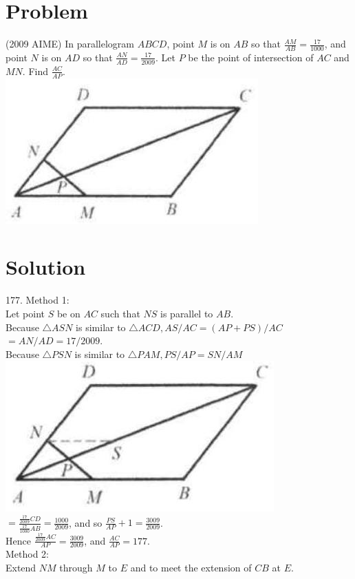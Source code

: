 \documentclass{article}
\begin{document}
\section*{Problem}
(2009 AIME) In parallelogram \(A B C D\), point \(M\) is on \(A B\) so that \(\frac{A M}{A B}=\frac{17}{1000}\), and point \(N\) is on \(A D\) so that \(\frac{A N}{A D}=\frac{17}{2009}\). Let \(P\) be the point of intersection of \(A C\) and \(M N\). Find \(\frac{A C}{A P}\).\\
\centering
\includegraphics[width=\textwidth]{images/130(2).jpg}

\section*{Solution}
177.
Method 1:\\
Let point \(S\) be on \(A C\) such that \(N S\) is parallel to \(A B\).\\
Because \(\triangle A S N\) is similar to \(\triangle A C D, A S / A C=(A P+P S) / A C\) \(=A N / A D=17 / 2009\).\\
Because \(\triangle P S N\) is similar to \(\triangle P A M, P S / A P=S N / A M\)\\
\centering
\includegraphics[width=\textwidth]{images/141(2).jpg}\\
\(=\frac{\frac{17}{2009} C D}{\frac{17}{1000} A B}=\frac{1000}{2009}\), and so \(\frac{P S}{A P}+1=\frac{3009}{2009}\).\\
Hence \(\frac{\frac{17}{2009} A C}{A P}=\frac{3009}{2009}\), and \(\frac{A C}{A P}=177\).\\
Method 2:\\
Extend \(N M\) through \(M\) to \(E\) and to meet the extension of \(C B\) at \(E\).
\end{document}
